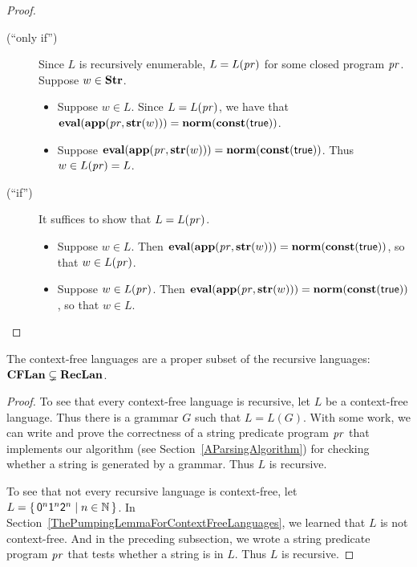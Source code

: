 \begin{proof}
\begin{description}
\item[\quad(``only if'')] Since $L$ is recursively enumerable,
  $L=L(\mathit{pr})$ for some closed program $\mathit{pr}$.  Suppose $w\in\mathbf{Str}$.
  \begin{itemize}
  \item Suppose $w\in L$.  Since $L=L(\mathit{pr})$, we have that
    $\mathbf{eval}(\mathbf{app}(\mathit{pr},\mathbf{str}(w)))=\mathbf{norm}(\mathbf{const}(\mathsf{true}))$.

  \item Suppose
    $\mathbf{eval}(\mathbf{app}(\mathit{pr},\mathbf{str}(w)))=\mathbf{norm}(\mathbf{const}(\mathsf{true}))$.
    Thus $w\in L(\mathit{pr})=L$.
  \end{itemize}

\item[\quad(``if'')] It suffices to show that $L=L(\mathit{pr})$.
  \begin{itemize}
  \item Suppose $w\in L$.  Then
    $\mathbf{eval}(\mathbf{app}(\mathit{pr},\mathbf{str}(w)))=\mathbf{norm}(\mathbf{const}(\mathsf{true}))$,
    so that $w\in L(\mathit{pr})$.

  \item Suppose $w\in L(\mathit{pr})$.  Then
    $\mathbf{eval}(\mathbf{app}(\mathit{pr},\mathbf{str}(w)))=\mathbf{norm}\allowbreak(\mathbf{const}(\mathsf{true}))$,
    so that $w\in L$.
  \end{itemize}
\end{description}
\end{proof}

\begin{theorem}
The context-free languages are a proper subset of the
recursive languages: $\mathbf{CFLan}\subsetneq\mathbf{RecLan}$.
\end{theorem}

\begin{proof}
To see that every context-free language is recursive, let $L$ be a
context-free language.  Thus there is a grammar $G$ such that
$L=L(G)$.  With some work, we can write and prove the correctness of a
string predicate program $\mathit{pr}$ that implements our algorithm (see
Section~\ref{AParsingAlgorithm}) for checking whether a string is
generated by a grammar.  Thus $L$ is recursive.

To see that not every recursive language is context-free, let
$L=\{ \, \mathsf{0}^n\mathsf{1}^n\mathsf{2}^n \mid n\in\mathbb{N} \, \}$.  In
Section~\ref{ThePumpingLemmaForContextFreeLanguages}, we
learned that $L$ is not context-free.  And in the preceding
subsection, we wrote a string predicate program $\mathit{pr}$ that tests
whether a string is in $L$.  Thus $L$ is recursive.
\end{proof}

